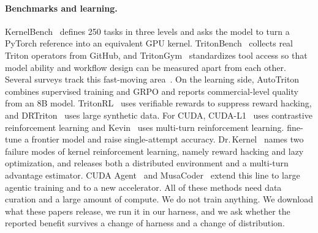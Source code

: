 \documentclass[11pt]{article}
\begin{document}
\paragraph{Benchmarks and learning.}
KernelBench~\citep{ouyang2024kernelbench} defines 250 tasks in three levels and asks the model to
turn a PyTorch reference into an equivalent GPU kernel. TritonBench~\citep{li2025tritonbench}
collects real Triton operators from GitHub, and TritonGym~\citep{tritongym2026} standardizes tool
access so that model ability and workflow design can be measured apart from each other.
Several surveys track this fast-moving
area~\citep{yu2026automated_kernel_survey, zhang2026compilerstack, gong2025codeopt_survey}.
On the learning side, AutoTriton~\citep{li2025autotriton} combines supervised training and GRPO and
reports commercial-level quality from an 8B model. TritonRL~\citep{woo2025tritonrl} uses verifiable
rewards to suppress reward hacking, and DRTriton~\citep{drtriton2025} uses large synthetic data.
For CUDA, CUDA-L1~\citep{cudal1_2026} uses contrastive reinforcement learning and
Kevin~\citep{baronio2025kevin} uses multi-turn reinforcement learning. \citet{tehrani2026gpt5kernel} fine-tune a frontier model and raise single-attempt accuracy.
Dr.\,Kernel~\citep{drkernel2026} names two failure modes of kernel reinforcement learning, namely
reward hacking and lazy optimization, and releases both a distributed environment and a
multi-turn advantage estimator. CUDA Agent~\citep{dai2026cudaagent} and
MusaCoder~\citep{cheng2026musacoder} extend this line to large agentic training and to a new
accelerator. All of these methods need data curation and a large amount of compute. We do not
train anything. We download what these papers release, we run it in our harness, and we ask
whether the reported benefit survives a change of harness and a change of distribution.
\end{document}
